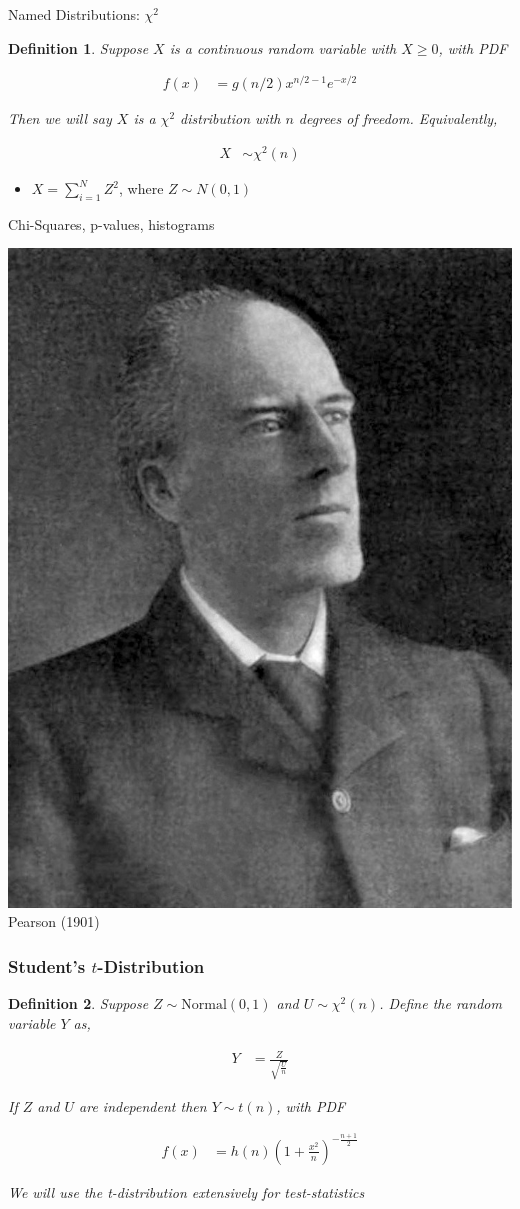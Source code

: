 \documentclass[aspectratio=169, handout]{beamer}
\newtheorem{defn}{Definition}
\numberwithin{equation}{section}
\begin{document}
\begin{frame}{Named Distributions: $\chi^{2}$}

\begin{defn}
Suppose $X$ is a continuous random variable with $X\geq 0$, with PDF

\begin{align*}
f(x) &= g(n/2) x^{n/2 - 1} e^{-x/2} 
\end{align*}

Then we will say $X$ is a $\chi^2$ distribution with $n$ degrees of freedom.  Equivalently,

\begin{align*}
X & \sim  \chi^{2}(n) 
\end{align*}

\end{defn}
\begin{itemize}
\item $X = \sum_{i=1}^{N} Z^2$, where $Z\sim N(0,1)$
\end{itemize}

\end{frame}


\begin{frame}{Chi-Squares, p-values, histograms}
\begin{center}
\includegraphics[width=1.7 in]{images/Pearson.jpeg}\\
Pearson (1901)
\end{center}
\end{frame}


\begin{frame}
\frametitle{Student's $t$-Distribution}

\begin{defn}
Suppose $Z \sim \text{Normal}(0, 1)$ and $U \sim \chi^2(n)$.  Define the random variable $Y$ as, 

\begin{align*}
Y &= \frac{Z}{\sqrt{\frac{U}{n}}}
\end{align*}

If $Z$ and $U$ are independent then $Y \sim t(n)$, with PDF

\begin{align*}
f(x) &= h(n) \left(1 + \frac{x^2}{n}\right)^{-\frac{n+1}{2}} 
\end{align*}

We will use the t-distribution extensively for \alert{test-statistics}


\end{defn}

\end{frame}
\end{document}
